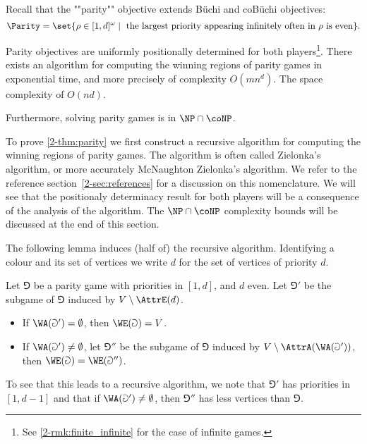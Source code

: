 Recall that the ""parity"" objective extends B{\"u}chi and coB{\"u}chi objectives:
\[
\Parity = \set{\rho \in [1,d]^\omega \mid \text{ the largest priority appearing infinitely often in } \rho \text{ is even}}.
\]

\begin{theorem}
\label{2-thm:parity}
Parity objectives are uniformly positionally determined for both players\footnote{See \cref{2-rmk:finite_infinite} for the case of infinite games.}.
There exists an algorithm for computing the winning regions of parity games in exponential time,
and more precisely of complexity $O(m n^d)$.
The space complexity of $O(nd)$.

Furthermore, solving parity games is in $\NP \cap \coNP$.
\end{theorem}

To prove \cref{2-thm:parity} we first construct a recursive algorithm for computing the winning regions of parity games.
The algorithm is often called Zielonka's algorithm, or more accurately McNaughton Zielonka's algorithm.
We refer to the reference section~\cref{2-sec:references} for a discussion on this nomenclature.
We will see that the positionaly determinacy result for both players will be a consequence of the analysis of the algorithm.
The $\NP \cap \coNP$ complexity bounds will be discussed at the end of this section.

The following lemma induces (half of) the recursive algorithm.
Identifying a colour and its set of vertices we write $d$ for the set of vertices of priority $d$.

\begin{lemma}
\label{2-lem:zielonka_even}
Let $\Game$ be a parity game with priorities in $[1,d]$, and $d$ even.
Let $\Game'$ be the subgame of $\Game$ induced by $V \setminus \AttrE(d)$.
\begin{itemize}
	\item If $\WA(\Game') = \emptyset$, then $\WE(\Game) = V$.
	\item If $\WA(\Game') \neq \emptyset$, 
	let $\Game''$ be the subgame of $\Game$ induced by $V \setminus \AttrA( \WA(\Game') )$,
	then $\WE(\Game) = \WE(\Game'')$.	
\end{itemize}
\end{lemma}

To see that this leads to a recursive algorithm, we note that $\Game'$ has priorities in $[1,d-1]$
and that if $\WA(\Game') \neq \emptyset$, then $\Game''$ has less vertices than $\Game$.

